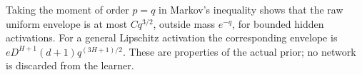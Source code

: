 Taking the moment of order $p=q$ in Markov's inequality shows that the
raw uniform envelope is at most $Cq^{3/2}$, outside mass $e^{-q}$,
for bounded hidden activations. For a general Lipschitz activation the
corresponding envelope is
$eD^{H+1}(d+1)q^{(3H+1)/2}$. These are properties of the actual prior;
no network is discarded from the learner.
